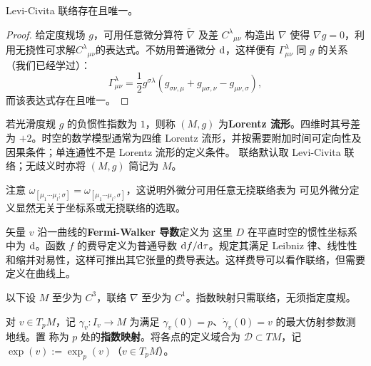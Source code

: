 \begin{theorem}
    Levi-Civita 联络存在且唯一。
\end{theorem}
\begin{proof}
    给定度规场 $g$，可用任意微分算符 $\tilde\nabla$ 及差 $C^\lambda{}_{\mu\nu}$ 构造出 $\nabla$ 使得 $\nabla g=0$，利用无挠性可求解$C^\lambda{}_{\mu\nu}$的表达式。不妨用普通微分 $\dd$，这样便有 $\Gamma^\lambda_{\mu\nu}$ 同 $g$ 的关系（我们已经学过）：
    \[\Gamma^\lambda_{\mu\nu}=\frac{1}{2}g^{\sigma\lambda}\left(g_{\sigma\nu,\mu}+ g_{\mu\sigma,\nu}-  g_{\mu\nu,\sigma}\right),\]
    而该表达式存在且唯一。
\end{proof}

\begin{example}
    若光滑度规 $g$ 的负惯性指数为 $1$，则称 $(M,g)$ 为\textbf{Lorentz 流形}。四维时其号差为 $+2$。时空的数学模型通常为四维 Lorentz 流形，并按需要附加时间可定向性及因果条件；单连通性不是 Lorentz 流形的定义条件。
    联络默认取 Levi-Civita 联络；无歧义时亦将 $(M,g)$ 简记为 $M$。
\end{example}

\begin{remark}
    注意 $\omega_{[\mu_1\cdots\mu_l;\sigma]}=\omega_{[\mu_1\cdots\mu_l,\sigma]}$，这说明外微分可用任意无挠联络表为
    可见外微分定义显然无关于坐标系或无挠联络的选取。
\end{remark}

\begin{example}
    矢量 $v$ 沿一曲线的\textbf{Fermi-Walker 导数}定义为
    这里 $D$ 在平直时空的惯性坐标系中为 $\dd$。函数 $f$ 的费导定义为普通导数 $\dd f/\dd\tau$。规定其满足 Leibniz 律、线性性和缩并对易性，这样可推出其它张量的费导表达。这样费导可以看作联络，但需要定义在曲线上。
\end{example}


以下设 $M$ 至少为 $C^3$，联络 $\nabla$ 至少为 $C^1$。指数映射只需联络，无须指定度规。

\begin{definition}\label{def:geodesic-exponential}
    对 $v\in T_pM$，记 $\gamma_v:I_v\to M$ 为满足 $\gamma_v(0)=p$、$\dot\gamma_v(0)=v$ 的最大仿射参数测地线。置
    称为 $p$ 处的\textbf{指数映射}。将各点的定义域合为 $\mathcal D\subset TM$，记 $\exp(v):=\exp_p(v)$（$v\in T_pM$）。
\end{definition}

